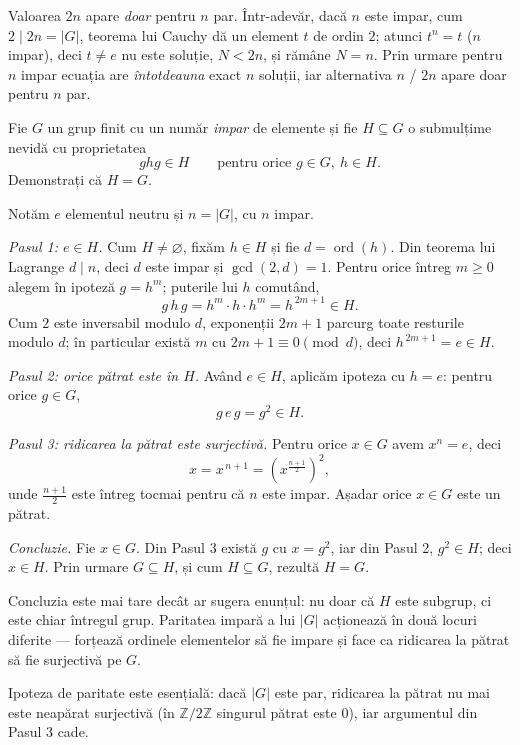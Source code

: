 \begin{obs}
Valoarea $2n$ apare \emph{doar} pentru $n$ par. Într-adevăr, dacă
$n$ este impar, cum $2\mid 2n=|G|$, teorema lui Cauchy dă un element $t$
de ordin $2$; atunci $t^{n}=t$ ($n$ impar), deci $t\neq e$ nu este
soluție, $N<2n$, și rămâne $N=n$. Prin urmare pentru $n$
impar ecuația are \emph{întotdeauna} exact $n$ soluții, iar
alternativa $n$ / $2n$ apare doar pentru $n$ par.
\end{obs}

\begin{problema}
Fie $G$ un grup finit cu un număr \emph{impar} de elemente și fie
$H \subseteq G$ o submulțime nevidă cu proprietatea
\[
  ghg \in H \qquad \text{pentru orice } g \in G,\ h \in H.
\]
Demonstrați că $H = G$.
\end{problema}

\begin{solutie}
Notăm $e$ elementul neutru și $n=|G|$, cu $n$ impar.

\smallskip
\textit{Pasul 1: $e \in H$.} Cum $H \neq \varnothing$, fixăm
$h \in H$ și fie $d=\operatorname{ord}(h)$. Din teorema lui Lagrange
$d \mid n$, deci $d$ este impar și $\gcd(2,d)=1$. Pentru orice
întreg $m \geq 0$ alegem în ipoteză $g=h^{m}$; puterile lui $h$
comutând,
\[
  g\,h\,g = h^{m}\cdot h \cdot h^{m} = h^{\,2m+1} \in H.
\]
Cum $2$ este inversabil modulo $d$, exponenții $2m+1$ parcurg toate
resturile modulo $d$; în particular există $m$ cu
$2m+1 \equiv 0 \pmod d$, deci $h^{\,2m+1}=e \in H$.

\smallskip
\textit{Pasul 2: orice pătrat este în $H$.} Având $e \in H$,
aplicăm ipoteza cu $h=e$: pentru orice $g \in G$,
\[
  g\,e\,g = g^{2} \in H .
\]

\smallskip
\textit{Pasul 3: ridicarea la pătrat este surjectivă.} Pentru orice
$x \in G$ avem $x^{n}=e$, deci
\[
  x = x^{\,n+1} = \left( x^{\frac{n+1}{2}} \right)^{\!2},
\]
unde $\frac{n+1}{2}$ este întreg tocmai pentru că $n$ este impar.
Așadar orice $x \in G$ este un pătrat.

\smallskip
\textit{Concluzie.} Fie $x \in G$. Din Pasul 3 există $g$ cu $x=g^{2}$,
iar din Pasul 2, $g^{2} \in H$; deci $x \in H$. Prin urmare $G \subseteq H$,
și cum $H \subseteq G$, rezultă $H=G$.
\end{solutie}

\begin{obs}
Concluzia este mai tare decât ar sugera enunțul: nu doar că $H$
este subgrup, ci este chiar întregul grup. Paritatea impară a lui
$|G|$ acționează în două locuri diferite --- forțează
ordinele elementelor să fie impare și face ca ridicarea la pătrat
să fie surjectivă pe $G$.

Ipoteza de paritate este esențială: dacă $|G|$ este par,
ridicarea la pătrat nu mai este neapărat surjectivă (în
$\mathbb{Z}/2\mathbb{Z}$ singurul pătrat este $0$), iar argumentul din
Pasul 3 cade.
\end{obs}

